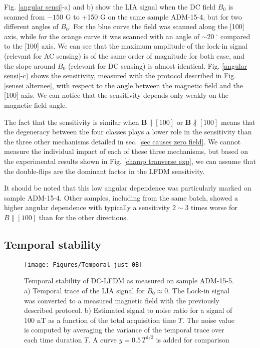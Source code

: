 \documentclass[a4paper,11pt]{report}
\begin{document}
Fig. \ref{angular sensi}-a) and b) show the LIA signal when the DC field $B_0$ is scanned from $-150$ G to +150 G on the same sample ADM-15-4, but for two different angles of $B_0$. For the blue curve the field was scanned along the [100] axis, while for the orange curve it was scanned with an angle of $\sim 20\ ^\circ$ compared to the [100] axis. We can see that the maximum amplitude of the lock-in signal (relevant for AC sensing) is of the same order of magnitude for both case, and the slope around $B_0$ (relevant for DC sensing) is almost identical. Fig. \ref{angular sensi}-c) shows the sensitivity, measured with the protocol described in Fig. \ref{sensei alternee}, with respect to the angle between the magnetic field and the [100] axis. We can notice that the sensitivity depends only weakly on the magnetic field angle. 

The fact that the sensitivity is similar when $\mathbf{B}\parallel [100]$ or $\mathbf{B}\nparallel [100]$ means that the degeneracy between the four classes plays a lower role in the sensitivity than the three other mechanisms detailed in sec. \ref{sec causes zero field}. We cannot measure the individual impact of each of these three mechanisms, but based on the experimental results shown in Fig. \ref{champ tranverse exp}, we can assume that the double-flips are the dominant factor in the LFDM sensitivity.

It should be noted that this low angular dependence was particularly marked on sample ADM-15-4. Other samples, including from the same batch, showed a higher angular dependence with typically a sensitivity $2 \sim 3$ times worse for $B\parallel [100]$ than for the other directions.

\subsection{Temporal stability}
\begin{figure}[h!]
\centering
\texttt{[image: Figures/Temporal\_just\_0B]}
\caption{Temporal stability of DC-LFDM as measured on sample ADM-15-5. a) Temporal trace of the LIA signal for $B_0 \approx 0$. The Lock-in signal was converted to a measured magnetic field with the previously described protocol. b) Estimated signal to noise ratio for a signal of 100 nT as a function of the total acquisition time $T$. The noise value is computed by averaging the variance of the temporal trace over each time duration $T$. A curve $y=0.5\, T^{1/2}$ is added for comparison}
\label{temporal 0B}
\end{figure}
\end{document}
